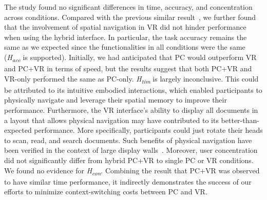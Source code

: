 The study found no significant differences in time, accuracy, and concentration across conditions. Compared with the previous similar result~\cite{pavanatto2021we}, we further found that the involvement of spatial navigation  in VR did not hinder performance when using the hybrid interface.
In particular, the task accuracy remains the same as we expected since the functionalities in all conditions were the same (\textit{H\textsubscript{acc}} is supported).
Initially, we had anticipated that PC would outperform VR and PC+VR in terms of speed, but the results suggest that both PC+VR and VR-only performed the same as PC-only. \textit{H\textsubscript{tim}} is largely inconclusive. 
This could be attributed to its intuitive embodied interactions, which enabled participants to physically navigate and leverage their spatial memory to improve their performance. 
Furthermore, the VR interface's ability to display all documents in a layout that allows physical navigation may have contributed to its better-than-expected performance.
More specifically, participants could just rotate their heads to scan, read, and search documents.
Such benefits of physical navigation have been verified in the context of large display walls~\cite{ball2007move}.
Moreover, user concentration did not significantly differ from hybrid PC+VR to single PC or VR conditions. We found no evidence for \textit{H\textsubscript{con}}. Combining the result that PC+VR was observed to have similar time performance, it indirectly demonstrates the success of our efforts to minimize context-switching costs between PC and VR.

